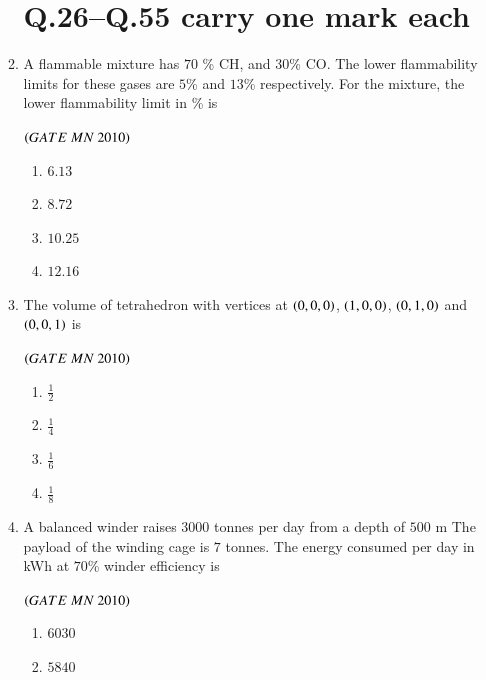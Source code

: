 \documentclass{article}
\begin{document}
\begin{enumerate}[label=Q.\arabic*., itemsep=1em, leftmargin=0pt, itemindent=*, labelsep=0.5em]
\begin{enumerate}[label=Q.\arabic*., start=17, leftmargin=2em]
\section*{Q.26--Q.55 carry one mark each}
\item A flammable mixture has $70$ \% CH, and $30$\% CO. The lower flammability limits for these gases are
$5$\% and $13$\% respectively. For the mixture, the lower flammability limit in \% is
\\
\begin{flushright}
\hfill$\left(GATE\ MN\ 2010\right)$
\end{flushright}
\begin{multicols}{4}
\begin{enumerate}[label=(\Alph*),leftmargin=4em]
\item $6.13$
\item $8.72$
\item $10.25$
\item $12.16$
\end{enumerate}
\end{multicols}
\bigskip
\item The volume of tetrahedron with vertices at $\left(0,0,0\right)$, $\left(1,0,0\right)$, $\left(0,1,0\right)$ and $\left(0,0,1\right)$ is
\\
\begin{flushright}
\hfill$\left(GATE\ MN\ 2010\right)$
\end{flushright}
\begin{multicols}{4}
\begin{enumerate}[label=(\Alph*),leftmargin=4em]
\item $\frac{1}{2}$
\item $\frac{1}{4}$
\item $\frac{1}{6}$
\item $\frac{1}{8}$
\bigskip
\end{enumerate}
\end{multicols}
\item  A balanced winder raises $3000$ tonnes per day from a depth of $500$ m The payload of the winding
cage is $7$ tonnes. The energy consumed per day in kWh at $70$\% winder efficiency is
\\
\begin{flushright}
\hfill$\left(GATE\ MN\ 2010\right)$
\end{flushright}
\begin{multicols}{4}
\begin{enumerate}[label=(\Alph*),leftmargin=4em]
\item $6030$
\item $5840$

\end{enumerate}
\end{multicols}
\end{enumerate}
\end{enumerate}
\end{document}
